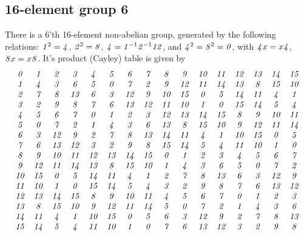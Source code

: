 \documentclass[12pt]{article}
\begin{document}
\subsection{16-element group 6}
There is a 6'th 16-element non-abelian group, generated by the following
relations:  $\G1^2=\G4$, $\G2^2=\G8$, $\G4=\G1^{-1}\G2^{-1}\G1 \G2$,
and $\G4^2=\G8^2=\G0$, with $\G4x=x\G4$, $\G8x=x\G8$.  It's product (Cayley) table
is given by
\begin{displaymath}
\begin{array}{cccccccccccccccc}
 \G0&  \G1&  \G2&  \G3&  \G4&  \G5&  \G6&  \G7&  \G8&  \G9& \G1\G0& \G1\G1& \G1\G2& \G1\G3& \G1\G4& \G1\G5 \\
 \G1&  \G4&  \G3&  \G6&  \G5&  \G0&  \G7&  \G2&  \G9& \G1\G2& \G1\G1& \G1\G4& \G1\G3&  \G8& \G1\G5& \G1\G0 \\
 \G2&  \G7&  \G8& \G1\G3&  \G6&  \G3& \G1\G2&  \G9& \G1\G0& \G1\G5&  \G0&  \G5& \G1\G4& \G1\G1&  \G4&  \G1 \\
 \G3&  \G2&  \G9&  \G8&  \G7&  \G6& \G1\G3& \G1\G2& \G1\G1& \G1\G0&  \G1&  \G0& \G1\G5& \G1\G4&  \G5&  \G4 \\
 \G4&  \G5&  \G6&  \G7&  \G0&  \G1&  \G2&  \G3& \G1\G2& \G1\G3& \G1\G4& \G1\G5&  \G8&  \G9& \G1\G0& \G1\G1 \\
 \G5&  \G0&  \G7&  \G2&  \G1&  \G4&  \G3&  \G6& \G1\G3&  \G8& \G1\G5& \G1\G0&  \G9& \G1\G2& \G1\G1& \G1\G4 \\
 \G6&  \G3& \G1\G2&  \G9&  \G2&  \G7&  \G8& \G1\G3& \G1\G4& \G1\G1&  \G4&  \G1& \G1\G0& \G1\G5&  \G0&  \G5 \\
 \G7&  \G6& \G1\G3& \G1\G2&  \G3&  \G2&  \G9&  \G8& \G1\G5& \G1\G4&  \G5&  \G4& \G1\G1& \G1\G0&  \G1&  \G0 \\
 \G8&  \G9& \G1\G0& \G1\G1& \G1\G2& \G1\G3& \G1\G4& \G1\G5&  \G0&  \G1&  \G2&  \G3&  \G4&  \G5&  \G6&  \G7 \\
 \G9& \G1\G2& \G1\G1& \G1\G4& \G1\G3&  \G8& \G1\G5& \G1\G0&  \G1&  \G4&  \G3&  \G6&  \G5&  \G0&  \G7&  \G2 \\
\G1\G0& \G1\G5&  \G0&  \G5& \G1\G4& \G1\G1&  \G4&  \G1&  \G2&  \G7&  \G8& \G1\G3&  \G6&  \G3& \G1\G2&  \G9 \\
\G1\G1& \G1\G0&  \G1&  \G0& \G1\G5& \G1\G4&  \G5&  \G4&  \G3&  \G2&  \G9&  \G8&  \G7&  \G6& \G1\G3& \G1\G2 \\
\G1\G2& \G1\G3& \G1\G4& \G1\G5&  \G8&  \G9& \G1\G0& \G1\G1&  \G4&  \G5&  \G6&  \G7&  \G0&  \G1&  \G2&  \G3 \\
\G1\G3&  \G8& \G1\G5& \G1\G0&  \G9& \G1\G2& \G1\G1& \G1\G4&  \G5&  \G0&  \G7&  \G2&  \G1&  \G4&  \G3&  \G6 \\
\G1\G4& \G1\G1&  \G4&  \G1& \G1\G0& \G1\G5&  \G0&  \G5&  \G6&  \G3& \G1\G2&  \G9&  \G2&  \G7&  \G8& \G1\G3 \\
\G1\G5& \G1\G4&  \G5&  \G4& \G1\G1& \G1\G0&  \G1&  \G0&  \G7&  \G6& \G1\G3& \G1\G2&  \G3&  \G2&  \G9&  \G8 \\
\end{array}
\end{displaymath}
\end{document}

